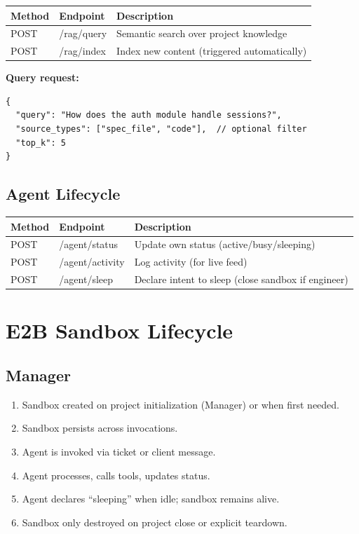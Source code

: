 \documentclass[11pt,a4paper]{article}
\begin{document}
\begin{longtable}{p{2.5cm} p{5cm} p{6cm}}
\toprule
\textbf{Method} & \textbf{Endpoint} & \textbf{Description} \\
\midrule
\endhead
POST   & /rag/query                 & Semantic search over project knowledge \\
POST   & /rag/index                 & Index new content (triggered automatically) \\
\bottomrule
\end{longtable}

\textbf{Query request:}
\begin{lstlisting}
{
  "query": "How does the auth module handle sessions?",
  "source_types": ["spec_file", "code"],  // optional filter
  "top_k": 5
}
\end{lstlisting}

\subsection{Agent Lifecycle}

\begin{longtable}{p{2.5cm} p{5cm} p{6cm}}
\toprule
\textbf{Method} & \textbf{Endpoint} & \textbf{Description} \\
\midrule
\endhead
POST   & /agent/status              & Update own status (active/busy/sleeping) \\
POST   & /agent/activity            & Log activity (for live feed) \\
POST   & /agent/sleep               & Declare intent to sleep (close sandbox if engineer) \\
\bottomrule
\end{longtable}

\section{E2B Sandbox Lifecycle}

\subsection{Manager}

\begin{enumerate}
  \item Sandbox created on project initialization (Manager) or when first needed.
  \item Sandbox persists across invocations.
  \item Agent is invoked via ticket or client message.
  \item Agent processes, calls tools, updates status.
  \item Agent declares ``sleeping'' when idle; sandbox remains alive.
  \item Sandbox only destroyed on project close or explicit teardown.
\end{enumerate}
\end{document}
